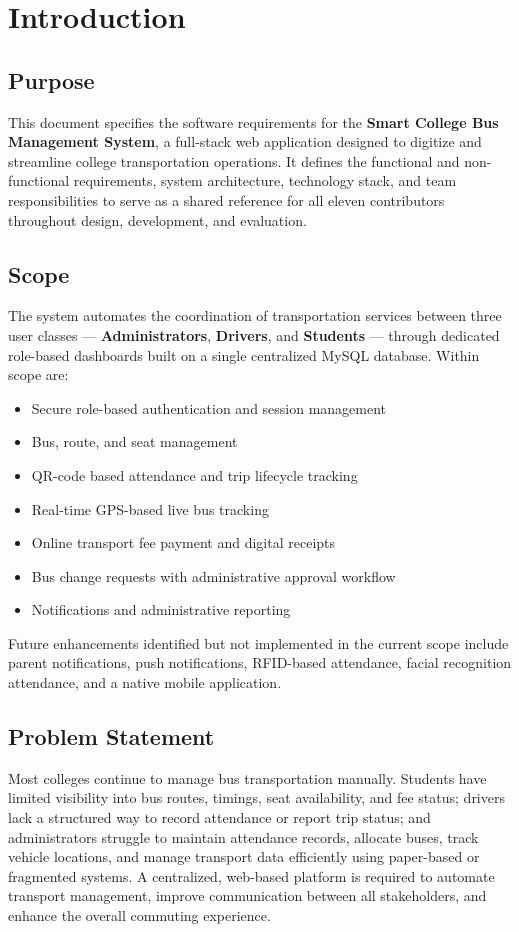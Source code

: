 \documentclass[11pt,a4paper]{report}
\begin{document}
\tableofcontents
\clearpage

\chapter{Introduction}

\section{Purpose}
This document specifies the software requirements for the \textbf{Smart College Bus Management System}, a full-stack web application designed to digitize and streamline college transportation operations. It defines the functional and non-functional requirements, system architecture, technology stack, and team responsibilities to serve as a shared reference for all eleven contributors throughout design, development, and evaluation.

\section{Scope}
The system automates the coordination of transportation services between three user classes --- \textbf{Administrators}, \textbf{Drivers}, and \textbf{Students} --- through dedicated role-based dashboards built on a single centralized MySQL database. Within scope are:

\begin{itemize}[leftmargin=1.3em]
  \item Secure role-based authentication and session management
  \item Bus, route, and seat management
  \item QR-code based attendance and trip lifecycle tracking
  \item Real-time GPS-based live bus tracking
  \item Online transport fee payment and digital receipts
  \item Bus change requests with administrative approval workflow
  \item Notifications and administrative reporting
\end{itemize}

Future enhancements identified but not implemented in the current scope include parent notifications, push notifications, RFID-based attendance, facial recognition attendance, and a native mobile application.

\section{Problem Statement}
Most colleges continue to manage bus transportation manually. Students have limited visibility into bus routes, timings, seat availability, and fee status; drivers lack a structured way to record attendance or report trip status; and administrators struggle to maintain attendance records, allocate buses, track vehicle locations, and manage transport data efficiently using paper-based or fragmented systems. A centralized, web-based platform is required to automate transport management, improve communication between all stakeholders, and enhance the overall commuting experience.
\end{document}

